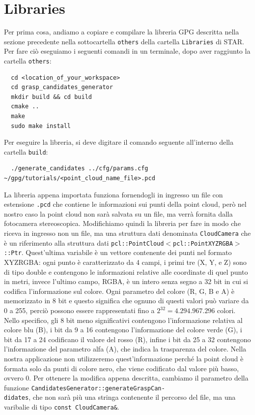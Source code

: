 \documentclass{report}
\begin{document}
\section{Libraries}
Per prima cosa, andiamo a copiare e compilare la libreria GPG descritta nella sezione precedente nella sottocartella \texttt{others} della cartella \texttt{Libraries} di STAR. Per fare ciò eseguiamo i seguenti comandi in un terminale, dopo aver raggiunto la cartella \texttt{others}:
\begin{verbatim}
  cd <location_of_your_workspace>  
  cd grasp_candidates_generator
  mkdir build && cd build
  cmake ..
  make
  sudo make install
\end{verbatim}
Per eseguire la libreria, si deve digitare il comando seguente all'interno della cartella \texttt{build}:
\begin{verbatim}
  ./generate_candidates ../cfg/params.cfg ~/gpg/tutorials/<point_cloud_name_file>.pcd
\end{verbatim}
La libreria appena importata funziona fornendogli in ingresso un file con estensione \texttt{.pcd} che contiene le informazioni sui punti della point cloud, però nel nostro caso la point cloud non sarà salvata su un file, ma verrà fornita dalla fotocamera stereoscopica. Modifichiamo quindi la libreria per fare in modo che riceva in ingresso non un file, ma una struttura dati denominata \texttt{CloudCamera} che è un riferimento alla struttura dati \texttt{pcl::PointCloud$<$pcl::PointXYZRGBA$>$::Ptr}. Quest'ultima variabile è un vettore contenente dei punti nel formato XYZRGBA: ogni punto è caratterizzato da 4 campi, i primi tre (X, Y, e Z) sono di tipo double e contengono le informazioni relative alle coordinate di quel punto in metri, invece l'ultimo campo, RGBA, è un intero senza segno a 32 bit in cui si codifica l'informazione sul colore. Ogni parametro del colore (R, G, B e A) è memorizzato in 8 bit e questo significa che ognuno di questi valori può variare da 0 a 255, perciò possono essere rappresentati fino a $\displaystyle{2^{32}=4.294.967.296}$ colori. Nello specifico, gli 8 bit meno significativi contengono l'informazione relativa al colore blu (B), i bit da 9 a 16 contengono l'informazione del colore verde (G), i bit da 17 a 24 codificano il valore del rosso (R), infine i bit da 25 a 32 contengono l'informazione del parametro alfa (A), che indica la trasparenza del colore. Nella nostra applicazione non utilizzeremo quest'informazione perché la point cloud è formata solo da punti di colore nero, che viene codificato dal valore più basso, ovvero 0. Per ottenere la modifica appena descritta, cambiamo il parametro della funzione \texttt{CandidatesGenerator::generateGraspCan-}\\\texttt{didates}, che non sarà più una stringa contenente il percorso del file, ma una varibalie di tipo \texttt{const CloudCamera\&}. \par
\end{document}

